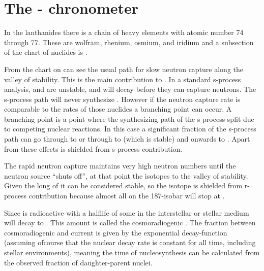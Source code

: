 \section{The - chronometer}

In the lanthanides there is a chain of heavy elements with atomic number 74 through 77.
These are wolfram, rhenium, osmium, and iridium and a subsection of the chart of nuclides is .



From the chart on can see the usual path for slow neutron capture along the valley of stability.
This is the main contribution to . In a standard s-process analysis,  and  are unstable, and will decay before they can capture neutrons. The s-process path will never synthesize . However if the neutron capture rate is comparable to the \betadecay rates of those nuclides a branching point can occur. A branching point is a point where the synthesizing path of the s-process split due to competing nuclear reactions. In this case a significant fraction of the s-process path can go through  to  or through  to  (which is stable) and onwards to . Apart from these effects  is shielded from s-process contribution.

The rapid neutron capture maintains very high neutron numbers until the neutron source ``shuts off'', at that point the isotopes \betadecay to the valley of stability. Given the long \halflife of  it can be considered stable, so the  isotope is shielded from r-process contribution because almost all \betadecay on the 187-isobar will stop at .

Since  is radioactive with a halflife of  some  in the interstellar or stellar medium will decay to . This amount is called the cosmoradiogenic . The fraction between cosmoradiogenic  and current  is given by the exponential decay-function (assuming ofcourse that the nuclear decay rate is constant for all time, including stellar environments), meaning the time of nucleosynthesis can be calculated from the observed fraction of daughter-parent nuclei.

